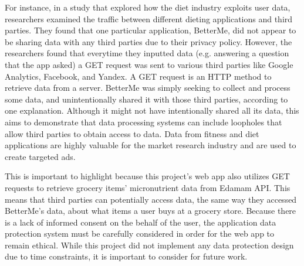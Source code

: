 \documentclass[10pt,twocolumn]{article}
\begin{document}
For instance, in a study that explored how the diet industry exploits user data, researchers examined the traffic between different dieting applications and third parties.\cite{privacy_international_2021} They found that one particular application, BetterMe, did not appear to be sharing data with any third parties due to their privacy policy. However, the researchers found that everytime they inputted data (e.g. answering a question that the app asked) a GET request was sent to various third parties like Google Analytics, Facebook, and Yandex. A GET request is an HTTP method to retrieve data from a server. BetterMe was simply seeking to collect and process some data, and unintentionally shared it with those third parties, according to one explanation. Although it might not have intentionally shared all its data, this aims to demonstrate that data processing systems can include loopholes that allow third parties to obtain access to data. Data from fitness and diet applications are highly valuable for the market research industry and are used to create targeted ads.

This is important to highlight because this project’s web app also utilizes GET requests to retrieve grocery items’ micronutrient data from Edamam API. This means that third parties can potentially access data, the same way they accessed BetterMe’s data, about what items a user buys at a grocery store. Because there is a lack of informed consent on the behalf of the user, the application data protection system must be carefully considered in order for the web app to remain ethical. While this project did not implement any data protection design due to time constraints, it is important to consider for future work. 

\printbibliography
\end{document}
